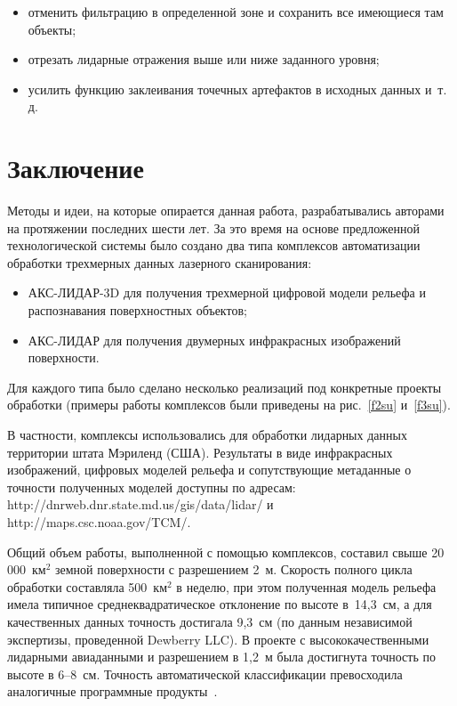    \begin{multicols}{2}
   
\begin{itemize}
\item отменить фильтрацию в определенной зоне и сохранить все имеющиеся 
там объекты;
\item отрезать лидарные отражения выше или ниже заданного уровня;
\item усилить функцию заклеивания точечных артефактов в исходных данных 
и~т.\,д.
  \end{itemize}

  \section{Заключение}
   
   Методы и идеи, на которые опирается данная работа, разрабатывались 
авторами на протяжении последних шести лет. За это время на основе 
предложенной технологической системы было создано два типа комплексов 
автоматизации обработки трехмерных данных лазерного сканирования:
   \begin{itemize}
\item АКС-ЛИДАР-3D для получения трехмерной цифровой модели рельефа и 
распознавания поверхностных объектов;
\item АКС-ЛИДАР для получения двумерных инфракрасных изображений 
поверхности.
\end{itemize}

Для каждого типа было сделано несколько реализаций под конкретные проекты 
обработки (примеры работы комплексов были приведены на рис.~\ref{f2su}
и~\ref{f3su}).

   В частности, комплексы использовались для обработки лидарных данных 
территории штата Мэриленд (США). Результаты в виде инфракрасных 
изображений, цифровых моделей рель\-ефа и сопутствующие метаданные о 
точ\-ности полученных моделей доступны по адресам: {\sf 
http://dnrweb.dnr.state.md.us/gis/data/lidar/ и http://maps.csc.noaa.gov/TCM/}.

   Общий объем работы, выполненной с помощью комплексов, составил свыше 
20\,000~км$^2$ земной поверхности с разрешением 2~м. Скорость полного 
цикла обработки составляла 500~км$^2$ в неделю, при этом полученная модель 
рельефа имела типичное среднеквадратическое отклонение по высоте 
в~14,3~см, а для качественных данных точность достигала 9,3~см (по данным 
независимой экспертизы, проведенной Dewberry LLC). В проекте с 
высококачественными лидарными авиаданными и разрешением в 1,2~м 
была достигнута точность по высоте в 6--8~см. Точность автоматической 
классификации превосходила аналогичные программные продукты~\cite{11su}.


\end{multicols}
